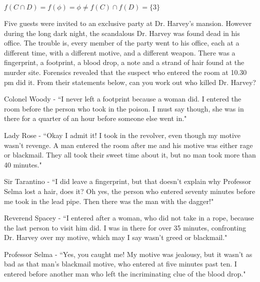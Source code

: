 \documentclass[addpoints]{exam}
\begin{document}
\begin{questions}
\begin{parts}
\begin{solution}
    $f(C \cap D) = f(\phi) = \phi \not=f ( C) \cap f (D) = \{3\}$
  \end{solution}
\end{parts}

\question
    Five guests were invited to an exclusive party at Dr. Harvey's mansion. However during the long dark night, the scandalous Dr. Harvey was found dead in his office. The trouble is, every member of the party went to his office, each at a different time, with a different motive, and a different weapon. There was a fingerprint, a footprint, a blood drop, a note and a strand of hair found at the murder site. Forensics revealed that the suspect who entered the room at 10.30 pm did it. From their statements below, can you work out who killed Dr. Harvey? 

Colonel Woody - ``I never left a footprint because a woman did. I entered the room before the person who took in the poison. I must say though, she was in there for a quarter of an hour before someone else went in."

Lady Rose - ``Okay I admit it! I took in the revolver, even though my motive wasn't revenge. A man entered the room after me and his motive was either rage or blackmail. They all took their sweet time about it, but no man took more than 40 minutes."

Sir Tarantino - ``I did leave a fingerprint, but that doesn't explain why Professor Selma lost a hair, does it? Oh yes, the person who entered seventy minutes before me took in the lead pipe. Then there was the man with the dagger!"

Reverend Spacey - ``I entered after a woman, who did not take in a rope, because the last person to visit him did. I was in there for over 35 minutes, confronting Dr. Harvey over my motive, which may I say wasn't greed or blackmail."

Professor Selma - ``Yes, you caught me! My motive was jealousy, but it wasn't as bad as that man's blackmail motive, who entered at five minutes past ten. I entered before another man who left the incriminating clue of the blood drop."

\end{questions}
\end{document}
